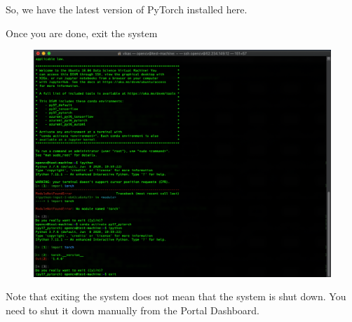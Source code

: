 So, we have the latest version of PyTorch installed here.

Once you are done, exit the system

\begin{figure}[H]
\begin{center} 
\includegraphics[scale=0.40]{figures/ssh13}
\end{center}
\end{figure}

Note that exiting the system does not mean that the system is shut down. You need to shut it down manually from the Portal Dashboard.